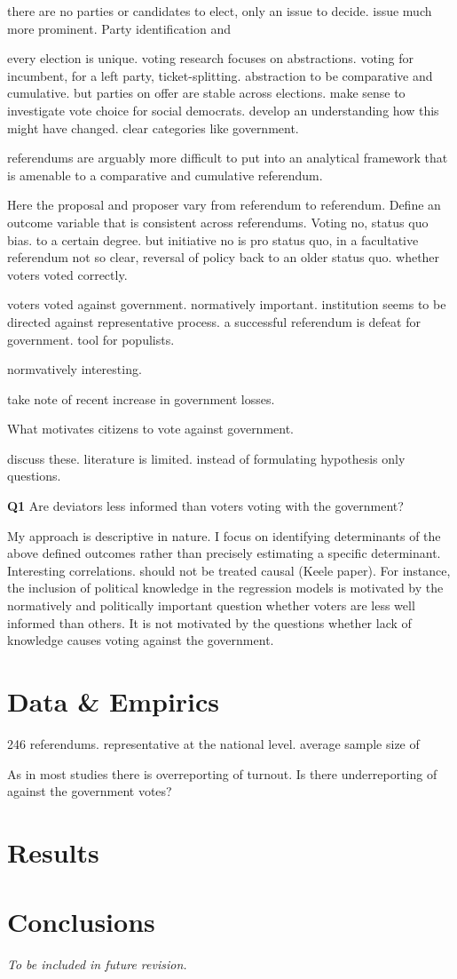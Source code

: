 \documentclass[11pt,a4paper]{article}
\begin{document}
there are no parties or candidates to elect, only an issue to decide. issue much more prominent. Party identification and 

every election is unique. voting research focuses on abstractions. voting for incumbent, for a left party, ticket-splitting. abstraction to be comparative and cumulative. but parties on offer are stable across elections. make sense to investigate vote choice for social democrats. develop an understanding how this might have changed. clear categories like government.

referendums are arguably more difficult to put into an analytical framework that is amenable to a comparative and cumulative referendum.

Here the proposal and proposer vary from referendum to referendum. 
Define an outcome variable that is consistent across referendums. Voting no, status quo bias. to a certain degree. but initiative no is pro status quo, in a facultative referendum not so clear, reversal of policy back to an older status quo. whether voters voted correctly. 

voters voted against government. normatively important. institution seems to be directed against representative process. a successful referendum is defeat for government. tool for populists.

normvatively interesting.

take note of recent increase in government losses.

What motivates citizens to vote against government.

discuss these. literature is limited. instead of formulating hypothesis only questions.

\textbf{Q1} Are deviators less informed than voters voting with the government?

My approach is descriptive in nature. I focus on identifying determinants of the above defined outcomes rather than precisely estimating a specific determinant. Interesting correlations. should not be treated causal (Keele paper). For instance, the inclusion of political knowledge in the regression models is motivated by the normatively and politically important question whether voters are less well informed than others. It is not motivated by the questions whether lack of knowledge causes voting against the government.

\section{Data \& Empirics}

246 referendums. representative at the national level. average sample size of 

As in most studies there is overreporting of turnout. Is there underreporting of against the government votes?

\section{Results}

\section{Conclusions}

\textit{To be included in future revision.}
\end{document}
